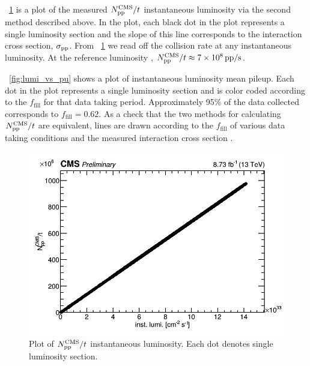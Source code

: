 \Fig~\ref{fig:dppdt_vs_L} is a plot of the measured $N_\text{\ensuremath{\mathrm{p}}\ensuremath{\mathrm{p}}}^\text{CMS}/t$ \vs instantaneous luminosity via the second method described above. In the plot, each black dot in the plot represents a single luminosity section and the slope of this line corresponds to the \pp interaction cross section, $\sigma_\text{\ensuremath{\mathrm{p}}\ensuremath{\mathrm{p}}}$. From \FigDot~\ref{fig:dppdt_vs_L} we read off the \pp collision rate at any instantaneous luminosity. At the reference luminosity , $N_\text{\ensuremath{\mathrm{p}}\ensuremath{\mathrm{p}}}^\text{CMS}/t \approx 7\times10^8 \text{\,\text{\ensuremath{\mathrm{p}}\ensuremath{\mathrm{p}}}/s}$.  

\Fig~\ref{fig:lumi_vs_pu} shows a plot of instantaneous luminosity \vs mean pileup. Each dot in the plot represents a single luminosity section and is color coded according to the $f_\text{fill}$ for that data taking period. Approximately 95\% of the data collected corresponds to $f_\text{fill} = 0.62$. As a check that the two methods for calculating $N_\text{\ensuremath{\mathrm{p}}\ensuremath{\mathrm{p}}}^\text{CMS}/t$ are equivalent, lines are drawn according to the $f_\text{fill}$ of various data taking conditions and the measured \pp interaction cross section \cite{Bawej:1711011, Sirunyan:2018nqx}. 

\begin{figure}
	\centering
	\includegraphics[width=\dummyFigWidth]{figures/neutron/dppdt_vs_L.png}
    \caption{Plot of $N_\text{\ensuremath{\mathrm{p}}\ensuremath{\mathrm{p}}}^\text{CMS}/t$ \vs instantaneous luminosity. Each dot denotes single luminosity section.}
	\label{fig:dppdt_vs_L}
\end{figure}

